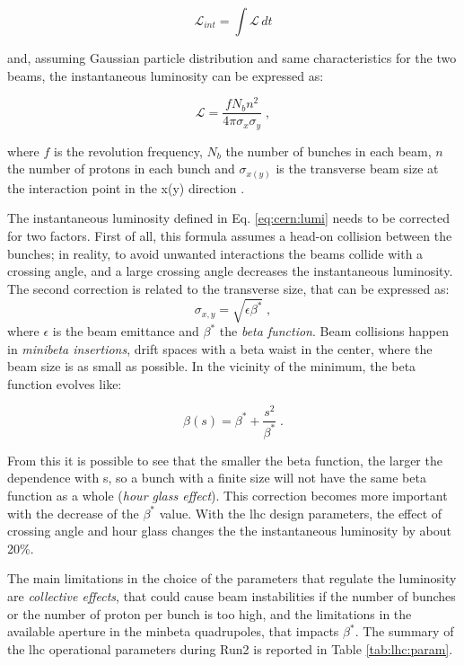 \begin{equation}
\label{eq:cern:intlumi}
\mathcal{L}_{int} = \int \mathcal{L} \, dt
\end{equation}

and, assuming Gaussian particle distribution and same characteristics for the two beams, the instantaneous luminosity can be expressed as:

\begin{equation}
\mathcal{L}=\frac{f N_b n^2}{4 \pi \sigma_{x}\sigma_{y} } \; ,
\label{eq:cern:lumi}
\end{equation}

where $f$ is the revolution frequency, $N_b$ the number of bunches in each beam, $n$ the number of protons in each bunch and $\sigma_{x(y)}$  is the transverse beam size at the interaction point in the x(y) direction . 

The instantaneous luminosity defined in Eq. \ref{eq:cern:lumi} needs to be corrected for two factors. First of all, this formula assumes a head-on collision between the bunches; in reality, to avoid unwanted interactions the beams collide with a crossing angle, and a large crossing angle decreases the instantaneous luminosity. The second correction is related to the transverse size, that can be expressed as:
\begin{equation}
\sigma_{x,y} = \sqrt{  \epsilon \beta^* } \; ,
\end{equation}
where $\epsilon$ is the beam emittance and $\beta^*$ the \textit{beta function}. Beam collisions happen in \textit{minibeta insertions}, drift spaces with a beta waist in the center, where the beam size is as small as possible. In the vicinity of the minimum, the beta function evolves like:

\begin{equation}
\beta(s) = \beta^* + \frac{s^2}{\beta^*} \; .
\end{equation}

From this it is possible to see that the smaller the beta function, the larger the dependence with s, so a bunch with a finite size will not have the same beta function as a whole (\textit{hour glass effect}). This correction becomes more important with the decrease of the $\beta^*$ value. With the \gls{lhc} design parameters, the effect of crossing angle and hour glass changes the the instantaneous luminosity by about 20\%.

The main limitations in the choice of the parameters that regulate the luminosity are \textit{collective effects}, that could cause beam instabilities if the number of bunches or the number of proton per bunch is too high, and the limitations in the available aperture in the minbeta quadrupoles, that impacts $\beta^*$. The summary of the \gls{lhc} operational parameters during Run2 is reported in Table \ref{tab:lhc:param}.


